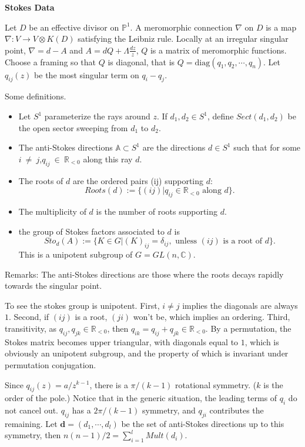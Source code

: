 \medskip
\textbf{Stokes Data}

Let $D$ be an effective divisor on $\mathbb{P}^1$. A meromorphic connection $\nabla$ on $D$ is a map $\nabla: V\rightarrow V\otimes K(D)$ satisfying the Leibniz rule. Locally at an irregular singular point, $\nabla = d - A$ and $A = dQ + \Lambda \frac{dz}{z}$, $Q$ is a matrix of meromorphic functions. Choose a framing so that $Q$ is diagonal, that is $Q = \text{diag}(q_1,q_2,\dotsb, q_n)$. Let $q_{ij}(z)$ be the most singular term on $q_i - q_j$.

Some definitions.
\begin{itemize}
  \item Let $S^1$ parameterize the rays around $z$. If $d_1,d_2\in S^1$, define $Sect(d_1,d_2)$ be the open sector sweeping from $d_1$ to $d_2$.
  \item The anti-Stokes directions $\mathbb{A} \subset S^1$ are the directions $d\in S^1$ such that for some $i~\neq~j$,$q_{ij}~\in~\mathbb{R}_{<0}$ along this ray $d$.
  \item The roots of $d$ are the ordered pairs (ij) supporting $d$:
  $$Roots(d) := \{(ij)| q_{ij}\in \mathbb{R}_{<0} \text{ along } d\}.$$
  \item The multiplicity of $d$ is the number of roots supporting $d$.
  \item the group of Stokes factors associated to $d$ is
  $$Sto_d(A) := \{K\in G |(K)_{ij} = \delta_{ij}, \text{ unless }(ij) \text{ is a root of } d\}.$$
  This is a unipotent subgroup of $G = GL(n,\mathbb{C})$.
\end{itemize}

Remarks: The anti-Stokes directions are those where the roots decays rapidly towards the singular point.

To see the stokes group is unipotent. First, $i\neq j$ implies the diagonals are always $1$. Second, if $(ij)$ is a root, $(ji)$ won't be, which implies an ordering. Third, transitivity, as $q_{ij}, q_{jk}\in \mathbb{R}_{<0}$, then $q_{ik} = q_{ij} + q_{jk}\in \mathbb{R}_{<0}$. By a permutation, the Stokes matrix becomes upper triangular, with diagonals equal to $1$, which is obviously an unipotent subgroup, and the property of which is invariant under permutation conjugation.

Since $q_{ij}(z) = a/z^{k-1}$, there is a $\pi /(k-1)$ rotational symmetry. ($k$ is the order of the pole.) Notice that in the generic situation, the leading terms of $q_i$ do not cancel out. $q_{ij}$ has a $2\pi /(k-1)$ symmetry, and $q_{ji}$ contributes the remaining. Let $\textbf{d}=(d_1,\dotsb,d_l)$ be the set of anti-Stokes directions up to this symmetry, then $n(n-1)/2 = \sum_{i=1}^l Mult(d_i)$.

